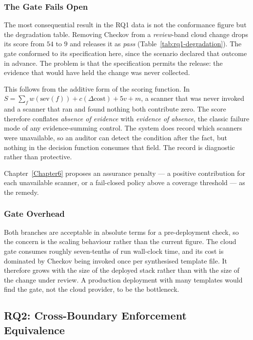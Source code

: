 \subsubsection{The Gate Fails Open}

The most consequential result in the RQ1 data is not the conformance figure but
the degradation table. Removing Checkov from a \emph{review}-band cloud change
drops its score from $54$ to $9$ and releases it as \emph{pass}
(Table~\ref{tab:rq1-degradation}). The gate conformed to its specification here,
since the scenario declared that outcome in advance. The problem is that the
specification permits the release: the evidence that would have held the change
was never collected.

This follows from the additive form of the scoring function. In
$S = \sum_{f} w(\mathrm{sev}(f)) + c(\Delta \mathrm{cost}) + 5v + m$, a scanner
that was never invoked and a scanner that ran and found nothing both contribute
zero. The score therefore conflates \emph{absence of evidence} with
\emph{evidence of absence}, the classic failure mode of any evidence-summing
control. The system does record which scanners were unavailable, so an auditor
can detect the condition after the fact, but nothing in the decision function
consumes that field. The record is diagnostic rather than protective.

Chapter~\ref{Chapter6}
proposes an assurance penalty --- a positive contribution for each unavailable
scanner, or a fail-closed policy above a coverage threshold --- as the remedy.

\subsubsection{Gate Overhead}

Both branches are acceptable in absolute terms for a pre-deployment check, so
the concern is the scaling behaviour rather than the current figure. The cloud
gate consumes roughly seven-tenths of run wall-clock time, and its cost is
dominated by Checkov being invoked once per synthesised template file. It
therefore grows with the size of the deployed stack rather than with the size of
the change under review. A production deployment with many templates would find
the gate, not the cloud provider, to be the bottleneck.

\subsection{RQ2: Cross-Boundary Enforcement Equivalence}
\label{subsec:discussion-rq2}

